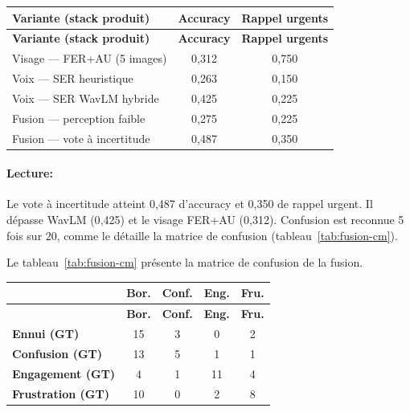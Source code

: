 {\small
\renewcommand{\arraystretch}{1.18}
\setlength{\tabcolsep}{4pt}
\begin{xltabular}{\textwidth}{|>{\raggedright\arraybackslash}X|c|c|}
\hline
{}
\textbf{Variante (stack produit)} & \textbf{Accuracy} & \textbf{Rappel urgents} \\
\hline
\endfirsthead
\hline
{}
\textbf{Variante (stack produit)} & \textbf{Accuracy} & \textbf{Rappel urgents} \\
\hline
\endhead
\endfoot
\endlastfoot
Visage --- FER+AU (5 images) & 0{,}312 & 0{,}750 \\
\hline
Voix --- SER heuristique & 0{,}263 & 0{,}150 \\
\hline
Voix --- SER WavLM hybride & 0{,}425 & 0{,}225 \\
\hline
Fusion --- perception faible & 0{,}275 & 0{,}225 \\
\hline
Fusion --- vote à incertitude & 0{,}487 & 0{,}350 \\
\hline
\end{xltabular}
\label{tab:fusion-av-produit}
}

\paragraph{Lecture:} Le vote à incertitude atteint
0{,}487 d'accuracy et 0{,}350 de rappel urgent. Il
dépasse WavLM (0{,}425) et le visage FER+AU (0{,}312). Confusion est
reconnue 5 fois sur 20, comme le détaille la matrice de confusion
(tableau~\ref{tab:fusion-cm}).

Le tableau~\ref{tab:fusion-cm} présente la matrice de confusion de la fusion.

{\small
\renewcommand{\arraystretch}{1.18}
\setlength{\tabcolsep}{4pt}
\begin{xltabular}{\textwidth}{|>{\raggedright\arraybackslash}X|c|c|c|c|}
\hline
{}
 & \textbf{Bor.} & \textbf{Conf.} & \textbf{Eng.} & \textbf{Fru.} \\
\hline
\endfirsthead
\hline
{}
 & \textbf{Bor.} & \textbf{Conf.} & \textbf{Eng.} & \textbf{Fru.} \\
\hline
\endhead
\endfoot
\endlastfoot
\textbf{Ennui (GT)} & 15 & 3 & 0 & 2 \\
\hline
\textbf{Confusion (GT)} & 13 & 5 & 1 & 1 \\
\hline
\textbf{Engagement (GT)} & 4 & 1 & 11 & 4 \\
\hline
\textbf{Frustration (GT)} & 10 & 0 & 2 & 8 \\
\hline
\end{xltabular}
\label{tab:fusion-cm}
}

